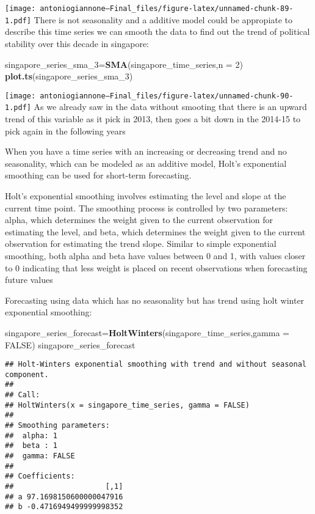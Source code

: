 \documentclass[
]{article}
\newenvironment{Shaded}{\begin{snugshade}}{\end{snugshade}}
\newcommand{\AttributeTok}[1]{\textcolor[rgb]{0.13,0.29,0.53}{#1}}
\newcommand{\ConstantTok}[1]{\textcolor[rgb]{0.56,0.35,0.01}{#1}}
\newcommand{\DecValTok}[1]{\textcolor[rgb]{0.00,0.00,0.81}{#1}}
\newcommand{\FunctionTok}[1]{\textcolor[rgb]{0.13,0.29,0.53}{\textbf{#1}}}
\newcommand{\NormalTok}[1]{#1}
\newcommand{\OtherTok}[1]{\textcolor[rgb]{0.56,0.35,0.01}{#1}}
\begin{document}
\texttt{[image: antoniogiannone---Final\_files/figure-latex/unnamed-chunk-89-1.pdf]}
There is not seasonality and a additive model could be appropiate to
describe this time series we can smooth the data to find out the trend
of political stability over this decade in singapore:

\begin{Shaded}
\begin{Highlighting}[]
\NormalTok{singapore\_series\_sma\_3}\OtherTok{=}\FunctionTok{SMA}\NormalTok{(singapore\_time\_series,}\AttributeTok{n =} \DecValTok{2}\NormalTok{)}
\FunctionTok{plot.ts}\NormalTok{(singapore\_series\_sma\_3)}
\end{Highlighting}
\end{Shaded}

\texttt{[image: antoniogiannone---Final\_files/figure-latex/unnamed-chunk-90-1.pdf]}
As we already saw in the data without smooting that there is an upward
trend of this variable as it pick in 2013, then goes a bit down in the
2014-15 to pick again in the following years

When you have a time series with an increasing or decreasing trend and
no seasonality, which can be modeled as an additive model, Holt's
exponential smoothing can be used for short-term forecasting.

Holt's exponential smoothing involves estimating the level and slope at
the current time point. The smoothing process is controlled by two
parameters: alpha, which determines the weight given to the current
observation for estimating the level, and beta, which determines the
weight given to the current observation for estimating the trend slope.
Similar to simple exponential smoothing, both alpha and beta have values
between 0 and 1, with values closer to 0 indicating that less weight is
placed on recent observations when forecasting future values

Forecasting using data which has no seasonality but has trend using holt
winter exponential smoothing:

\begin{Shaded}
\begin{Highlighting}[]
\NormalTok{singapore\_series\_forecast}\OtherTok{=}\FunctionTok{HoltWinters}\NormalTok{(singapore\_time\_series,}\AttributeTok{gamma =} \ConstantTok{FALSE}\NormalTok{)}
\NormalTok{singapore\_series\_forecast}
\end{Highlighting}
\end{Shaded}

\begin{verbatim}
## Holt-Winters exponential smoothing with trend and without seasonal component.
## 
## Call:
## HoltWinters(x = singapore_time_series, gamma = FALSE)
## 
## Smoothing parameters:
##  alpha: 1
##  beta : 1
##  gamma: FALSE
## 
## Coefficients:
##                     [,1]
## a 97.1698150600000047916
## b -0.4716949499999998352
\end{verbatim}
\end{document}
